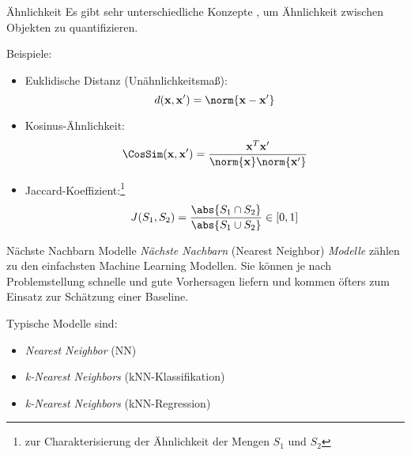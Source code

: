 \begin{defi}{Ähnlichkeit}
    Es gibt sehr unterschiedliche Konzepte , um Ähnlichkeit zwischen Objekten zu quantifizieren.

    Beispiele:
    \begin{itemize}
        \item Euklidische Distanz (Unähnlichkeitsmaß):
              \[
                  d(\mathbf{x}, \mathbf{x}') = \norm{\mathbf{x} - \mathbf{x}'}
              \]
        \item Kosinus-Ähnlichkeit:
              \[
                  \CosSim(\mathbf{x}, \mathbf{x}') = \frac{\mathbf{x}^T \mathbf{x}'}{\norm{\mathbf{x}} \norm{\mathbf{x}'}}
              \]
        \item Jaccard-Koeffizient:\footnote{zur Charakterisierung der Ähnlichkeit der Mengen $S_1$ und $S_2$}
              \[
                  J(S_1, S_2) = \frac{\abs{S_1 \cap S_2}}{\abs{S_1 \cup S_2}} \in [0, 1]
              \]
    \end{itemize}
\end{defi}

\begin{defi}{Nächste Nachbarn Modelle}
    \emph{Nächste Nachbarn} (Nearest Neighbor) \emph{Modelle} zählen zu den einfachsten Machine Learning Modellen.
    Sie können je nach Problemstellung schnelle und gute Vorhersagen liefern und kommen öfters zum Einsatz zur Schätzung einer Baseline.

    Typische Modelle sind:
    \begin{itemize}
        \item \emph{Nearest Neighbor} (NN)
        \item \emph{k-Nearest Neighbors} (kNN-Klassifikation)
        \item \emph{k-Nearest Neighbors} (kNN-Regression)
    \end{itemize}
\end{defi}

